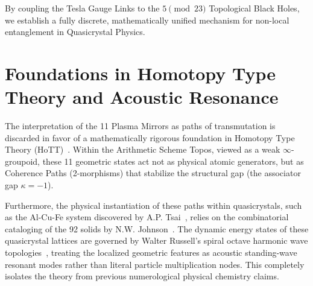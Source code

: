 By coupling the Tesla Gauge Links to the $5 \pmod{23}$ Topological Black Holes, we establish a fully discrete, mathematically unified mechanism for non-local entanglement in Quasicrystal Physics.



\section{Foundations in Homotopy Type Theory and Acoustic Resonance}

The interpretation of the 11 Plasma Mirrors as paths of transmutation is discarded in favor of a mathematically rigorous foundation in Homotopy Type Theory (HoTT)~\cite{univalent_foundations}. Within the Arithmetic Scheme Topos, viewed as a weak $\infty$-groupoid, these 11 geometric states act not as physical atomic generators, but as Coherence Paths (2-morphisms) that stabilize the structural gap (the associator gap $\kappa = -1$). 

Furthermore, the physical instantiation of these paths within quasicrystals, such as the Al-Cu-Fe system discovered by A.P. Tsai~\cite{tsai_alcufe}, relies on the combinatorial cataloging of the 92 solids by N.W. Johnson~\cite{johnson1966}. The dynamic energy states of these quasicrystal lattices are governed by Walter Russell's spiral octave harmonic wave topologies~\cite{russell_universal}, treating the localized geometric features as acoustic standing-wave resonant modes rather than literal particle multiplication nodes. This completely isolates the theory from previous numerological physical chemistry claims.

